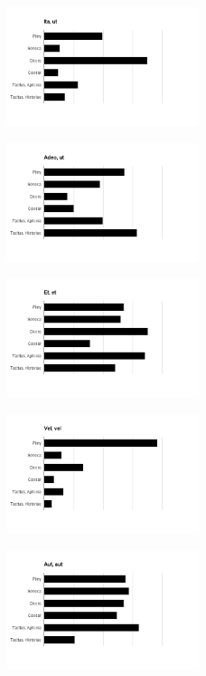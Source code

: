 \begin{figure}
\includegraphics[width=0.5\textwidth]{itaut.png}
\end{figure}

\begin{figure}
\includegraphics[width=0.5\textwidth]{adeout.png}
\end{figure}

\begin{figure}
\includegraphics[width=0.5\textwidth]{etet.png}
\end{figure}

\begin{figure}
\includegraphics[width=0.5\textwidth]{velvel.png}
\end{figure}

\begin{figure}
\includegraphics[width=0.5\textwidth]{autaut.png}
\end{figure}

